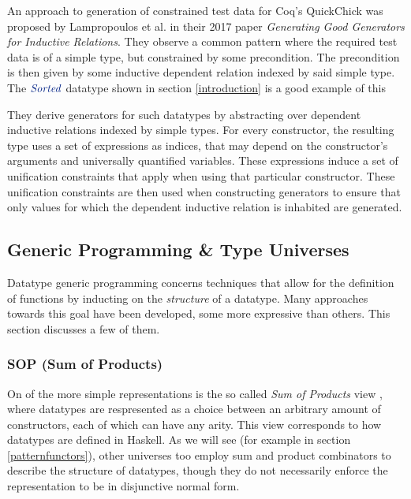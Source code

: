 \documentclass[a4paper,msc,twosized=semi]{uustthesis}
\newcommand*{\mathcolor}{}
\def\mathcolor#1#{\mathcoloraux{#1}}
\newcommand*{\mathcoloraux}[3]{%
  \protect\leavevmode
  \begingroup
    \color#1{#2}#3%
  \endgroup
}
\newcommand{\HSCon}[1]{\mathcolor{hsblue3}{\mathit{#1}}}
\begin{document}
    An approach to generation of constrained test data for Coq's QuickChick was proposed by Lampropoulos et al. \cite{lampropoulos2017generating} in their 2017 paper \textit{Generating Good Generators for Inductive Relations}. They observe a common pattern where the required test data is of a simple type, but constrained by some precondition. The precondition is then given by some inductive dependent relation indexed by said simple type. The \ensuremath{\HSCon{Sorted}} datatype shown in section \ref{introduction} is a good example of this

    They derive generators for such datatypes by abstracting over dependent inductive relations indexed by simple types. For every constructor, the resulting type uses a set of expressions as indices, that may depend on the constructor's arguments and universally quantified variables. These expressions induce a set of unification constraints that apply when using that particular constructor. These unification constraints are then used when constructing generators to ensure that only values for which the dependent inductive relation is inhabited are generated. 

  \subsection{Generic Programming \& Type Universes}\label{sec:lituniverses}

    Datatype generic programming concerns techniques that allow for the definition of functions by inducting on the \textit{structure} of a datatype. Many approaches towards this goal have been developed, some more expressive than others. This section discusses a few of them.  

  \subsubsection{SOP (Sum of Products)}\label{sop}

    On of the more simple representations is the so called \textit{Sum of Products} view \cite{de2014true}, where datatypes are respresented as a choice between an arbitrary amount of constructors, each of which can have any arity. This view corresponds to how datatypes are defined in Haskell. As we will see (for example in section \ref{patternfunctors}), other universes too employ sum and product combinators to describe the structure of datatypes, though they do not necessarily enforce the representation to be in disjunctive normal form. 
\end{document}
